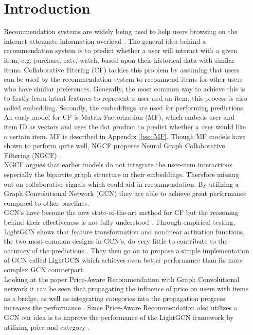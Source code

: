 \section{Introduction}
Recommendation systems are widely being used to help users browsing on the internet attenuate information overload \cite{YT_rec,Pint_rec}.
The general idea behind a recommendation system is to predict whether a user will interact with a given item, e.g. purchase, rate, watch, based upon their historical data with similar items.
Collaborative filtering (CF) tackles this problem by assuming that users can be used by the recommendation system to recommend items for other users who have similar preferences.
Generally, the most common way to achieve this is to firstly learn latent features to represent a user and an item, this process is also called embedding.
Secondly, the embeddings are used for performing predictions.
\\
An early model for CF is Matrix Factorization (MF), which embeds user and item ID as vectors and uses the dot product to predict whether a user would like a certain item.
MF is described in Appendix \autoref{bsc::MF}.
Though MF models have shown to perform quite well, NGCF proposes Neural Graph Collaborative Filtering (NGCF) \cite{NGCF_2019}.
\\
NGCF argues that earlier models do not integrate the user-item interactions especially the bipartite graph structure in their embeddings.
Therefore missing out on collaborative signals which could aid in recommendation.
By utilizing a Graph Convolutional Network (GCN) they are able to achieve great performance compared to other baselines.
\\
GCN's have become the new state-of-the-art method for CF but the reasoning behind their effectiveness is not fully understood \cite{lightgcn}.
Through empirical testing, LightGCN shows that feature transformation and nonlinear activation functions, the two most common designs in GCN's, do very little to contribute to the accuracy of the predictions \cite{lightgcn}.
They then go on to propose a simple implementation of GCN called LightGCN which achieves even better performance than its more complex GCN counterpart.
\\
Looking at the paper Price-Aware Recommendation with Graph Convolutional network it can be seen that propagating the influence of price on users with items as a bridge, as well as integrating categories into the propagation progress increases the performance \cite{Priceaware} .
Since Price-Aware Recommendation also utilizes a GCN our idea is to improve the performance of the LightGCN framework by utilizing price and category \cite{Priceaware}.

